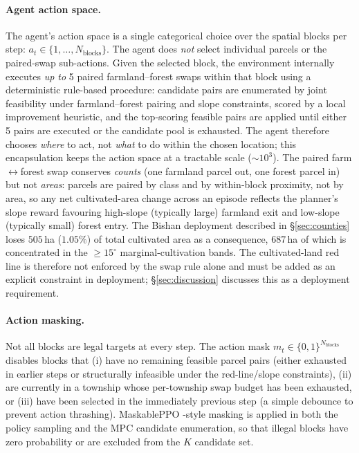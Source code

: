 \documentclass[11pt]{article}
\begin{document}
\paragraph{Agent action space.}
The agent's action space is a single categorical choice over the spatial blocks per step: $a_t \in \{1, \ldots, N_{\text{blocks}}\}$. The agent does \emph{not} select individual parcels or the paired-swap sub-actions. Given the selected block, the environment internally executes \emph{up to} 5 paired farmland--forest swaps within that block using a deterministic rule-based procedure: candidate pairs are enumerated by joint feasibility under farmland--forest pairing and slope constraints, scored by a local improvement heuristic, and the top-scoring feasible pairs are applied until either 5 pairs are executed or the candidate pool is exhausted. The agent therefore chooses \emph{where} to act, not \emph{what} to do within the chosen location; this encapsulation keeps the action space at a tractable scale ($\sim 10^3$). The paired farm$\leftrightarrow$forest swap conserves \emph{counts} (one farmland parcel out, one forest parcel in) but not \emph{areas}: parcels are paired by class and by within-block proximity, not by area, so any net cultivated-area change across an episode reflects the planner's slope reward favouring high-slope (typically large) farmland exit and low-slope (typically small) forest entry. The Bishan deployment described in \S\ref{sec:counties} loses $505$\,ha ($1.05\%$) of total cultivated area as a consequence, $687$\,ha of which is concentrated in the $\geq 15^{\circ}$ marginal-cultivation bands. The cultivated-land red line is therefore not enforced by the swap rule alone and must be added as an explicit constraint in deployment; \S\ref{sec:discussion} discusses this as a deployment requirement.

\paragraph{Action masking.}
Not all blocks are legal targets at every step. The action mask $m_t \in \{0, 1\}^{N_{\text{blocks}}}$ disables blocks that (i) have no remaining feasible parcel pairs (either exhausted in earlier steps or structurally infeasible under the red-line/slope constraints), (ii) are currently in a township whose per-township swap budget has been exhausted, or (iii) have been selected in the immediately previous step (a simple debounce to prevent action thrashing). MaskablePPO \citep{ross2011reduction,schulman2017proximal,huang2022maskable}-style masking is applied in both the policy sampling and the MPC candidate enumeration, so that illegal blocks have zero probability or are excluded from the $K$ candidate set.
\end{document}
